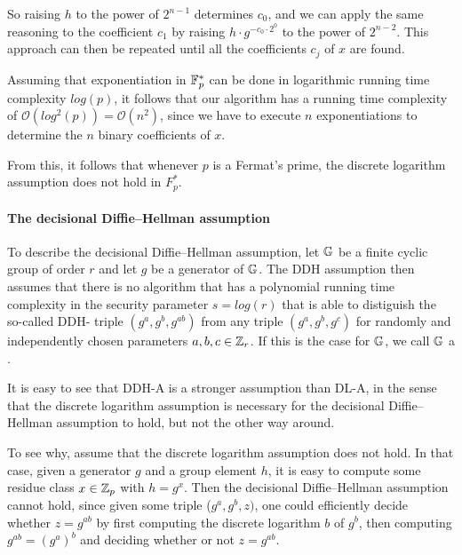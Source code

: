\begin{example}
So raising $h$ to the power of $2^{n-1}$ determines $c_0$, and we can apply the same reasoning to the coefficient $c_1$ by raising $h\cdot g^{-c_0\cdot 2^0}$ to the power of $2^{n-2}$. This approach can then be repeated until all the coefficients $c_j$ of $x$ are found.

Assuming that exponentiation in $\mathbb{F}_p^*$ can be done in logarithmic running time complexity $log(p)$, it follows that our algorithm has a running time complexity of 
$\mathcal{O}(log^2(p))=\mathcal{O}(n^2)$, since we have to execute $n$ exponentiations to determine the $n$ binary coefficients of $x$. 

From this, it follows that whenever $p$ is a Fermat's prime, the discrete logarithm assumption does not hold in $F_p^*$.
\end{example}
\paragraph{The decisional Diffie--Hellman assumption}
To describe the decisional Diffie--Hellman assumption, let $\mathbb{G}$ be a finite cyclic group of order $r$ and let $g$ be a generator of $\mathbb{G}$. The DDH assumption then assumes that there is no algorithm that has a polynomial running time complexity in the security parameter $s= log(r)$ that is able to distiguish the so-called DDH- triple $(g^a,g^b, g^{ab})$ from any triple $(g^a,g^b,g^c)$ for randomly and independently  chosen parameters $a,b,c\in \mathbb{Z}_r$. If this is the case for $\mathbb{G}$, we call $\mathbb{G}$ a .

It is easy to see that DDH-A is a stronger assumption than DL-A, in the sense that the discrete logarithm assumption is necessary for the decisional  Diffie--Hellman assumption to hold, but not the other way around. 

To see why, assume that the discrete logarithm assumption does not hold. In that case, given a generator $g$ and a group element $h$, it is easy to compute some residue class $x\in\mathbb{Z}_p$ with $h=g^x$. Then the decisional Diffie--Hellman assumption cannot hold, since given some triple ($ g^a , g^b , z )$, one could efficiently decide whether $z = g^{ab}$ by first computing the discrete logarithm $b$ of  $g^b$, then computing $g^{ab}= (g^a)^b$ and deciding whether or not $z=g^{ab}$.

